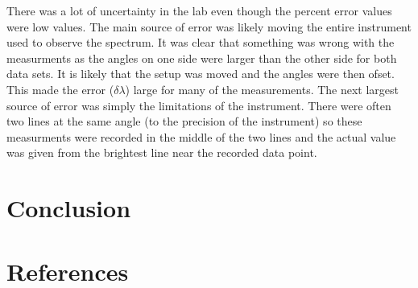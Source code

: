 \documentclass[singlecolumn, amsmath]{revtex4}
\begin{document}
	There was a lot of uncertainty in the lab even though the percent error values were low values. The main source of error was likely moving the entire instrument used to observe the spectrum. It was clear that something was wrong with the measurments as the angles on one side were larger than the other side for both data sets. It is likely that the setup was moved and the angles were then ofset. This made the error ($\delta\lambda$) large for many of the measurements. The next largest source of error was simply the limitations of the instrument. There were often two lines at the same angle (to the precision of the instrument) so these measurments were recorded in the middle of the two lines and the actual value was given from the brightest line near the recorded data point.

\section{Conclusion}





\section{References}
\end{document}
